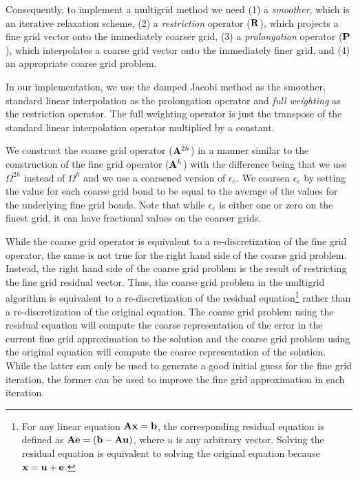 \documentclass[11pt]{iopart}
\begin{document}
Consequently, to implement a multigrid method we need 
(1) a {\it{smoother}}, which is an iterative relaxation scheme, (2)
a {\it{restriction}} operator (${\bf R}$), which projects a fine grid vector onto the immediately coarser grid, 
(3) a {\it{prolongation}} operator (${\bf P}$), which interpolates a coarse grid vector onto the 
immediately finer grid, and (4) an appropriate coarse grid problem. 

In our implementation, we use the damped Jacobi method as the smoother, 
standard linear interpolation as the prolongation operator and {\it{full weighting}} as the restriction operator. 
The full weighting operator is just the transpose of the standard linear interpolation operator multiplied by a constant. 

 We construct the coarse grid operator (${\bf A}^{2h}$) in a manner similar to the construction of the fine grid 
 operator (${\bf A}^{h}$) with the difference being that we use $\Omega^{2h}$ instead of $\Omega^{h}$ and we use a
 coarsened version of $\epsilon_e$. We coarsen $\epsilon_e$ by setting the value for each coarse grid bond to
 be equal to the average of the values for the underlying fine grid bonds. Note that while $\epsilon_e$ is either one or zero
 on the finest grid, it can have fractional values on the coarser grids.

While the coarse grid operator is equivalent to a re-discretization of the fine grid operator, the same is not true for the right hand side
 of the coarse grid problem. Instead, the right hand side of the coarse grid problem is the result of restricting 
 the fine grid residual vector. Thus, the coarse grid problem in the multigrid algorithm is equivalent to
 a re-discretization of the residual equation\footnote{For any linear equation ${\bf{A}} {\bf{x}} = {\bf{b}}$, the corresponding residual equation is defined as ${\bf{A}} {\bf{e}} = ({\bf{b}} - {\bf{A}} {\bf{u}})$, where $u$ is any arbitrary vector. Solving the residual equation is equivalent to solving the original equation because ${\bf{x}} = {\bf{u}} + {\bf{e}}$.
} rather than a re-discretization of the original equation. The coarse grid problem
 using the residual equation will compute the coarse representation of the error in the current fine grid approximation to
 the solution and the coarse grid problem using the original equation will compute the coarse representation of the solution.
 While the latter can only be used to generate a good initial guess for the fine grid iteration, the former can be used
 to improve the fine grid approximation in each iteration. 
\end{document}
